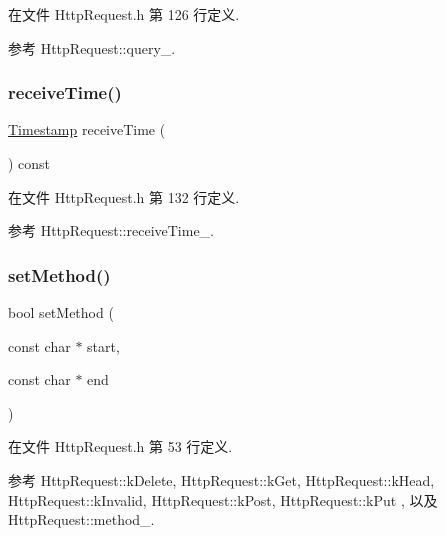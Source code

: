 在文件 Http\+Request.\+h 第 126 行定义.



参考 Http\+Request\+::query\+\_\+.

\mbox{\label{classmuduo_1_1net_1_1HttpRequest_a2651294d555fd3fc36d838513d2a6663}} 
\subsubsection{\texorpdfstring{receive\+Time()}{receiveTime()}}
{\footnotesize\ttfamily \hyperlink{classmuduo_1_1Timestamp}{Timestamp} receive\+Time (\begin{DoxyParamCaption}{ }\end{DoxyParamCaption}) const\hspace{0.3cm}{\ttfamily [inline]}}



在文件 Http\+Request.\+h 第 132 行定义.



参考 Http\+Request\+::receive\+Time\+\_\+.

\mbox{\label{classmuduo_1_1net_1_1HttpRequest_ab2416e259145d033c13675213e2d06d9}} 
\subsubsection{\texorpdfstring{set\+Method()}{setMethod()}}
{\footnotesize\ttfamily bool set\+Method (\begin{DoxyParamCaption}\item[{const char $\ast$}]{start,  }\item[{const char $\ast$}]{end }\end{DoxyParamCaption})\hspace{0.3cm}{\ttfamily [inline]}}



在文件 Http\+Request.\+h 第 53 行定义.



参考 Http\+Request\+::k\+Delete, Http\+Request\+::k\+Get, Http\+Request\+::k\+Head, Http\+Request\+::k\+Invalid, Http\+Request\+::k\+Post, Http\+Request\+::k\+Put , 以及 Http\+Request\+::method\+\_\+.

